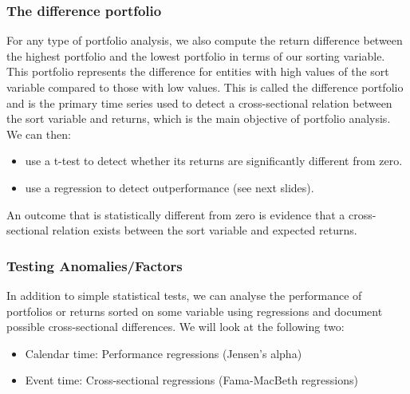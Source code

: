 \documentclass[xcolor=dvipsnames, english, 8pt]{beamer}
\begin{document}
\begin{frame}
	\frametitle{The difference portfolio}
	For any type of portfolio analysis, we also compute the return difference between the highest portfolio and the lowest portfolio in terms of our sorting variable. This portfolio represents the difference for entities with high values of the sort variable compared to those with low values. This is called the {\color{ubRed} difference portfolio} and is the primary time series used to detect a cross-sectional relation between the sort variable and returns, which is the main objective of portfolio analysis. We can then:\vspace{0.25cm}\\	\begin{itemize}
		\item use a t-test to detect whether its returns are significantly different from zero.
		\item use a regression to detect outperformance (see next slides).\vspace{0.25cm}\\
	\end{itemize}
	An outcome that is statistically different from zero is evidence that a cross-sectional relation exists between the sort variable and expected returns.
\end{frame}



\begin{frame}
    \frametitle{Testing Anomalies/Factors}
In addition to simple statistical tests, we can analyse the performance of portfolios or returns sorted on some variable using regressions and document possible cross-sectional differences. We will look at the following two:\vspace{0.25cm}\\
\begin{itemize}
    \item {\color{ubRed}Calendar time}: Performance regressions (Jensen's alpha)
    \item {\color{ubRed}Event time}: Cross-sectional regressions (Fama-MacBeth regressions) 
    \end{itemize}
\end{frame}
\end{document}
